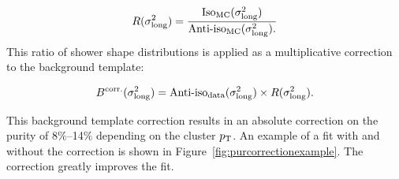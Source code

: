 \begin{equation}
    R(\sigma^{2}_{\mathrm{long}})=\frac{\text{Iso}_{\text{MC}}(\sigma^{2}_{\mathrm{long}})}{\text{Anti-iso}_{\text{MC}}(\sigma^{2}_{\mathrm{long}}).}
    \label{eq:bkgtemplateweights}
\end{equation}
This ratio of shower shape distributions is applied as a multiplicative correction to the background template:

\begin{equation}
    B^{\text{corr.}}(\sigma^{2}_{\mathrm{long}})=\text{Anti-iso}_{\text{data}}(\sigma^{2}_{\mathrm{long}})\times R(\sigma^{2}_{\mathrm{long}}).
    \label{eq:bkgtemplatecorrection}
\end{equation}

This background template correction results in an absolute correction on the purity of 8$\%$--14$\%$ depending on the cluster $p_{\mathrm{T}}$. An example of a fit with and without the correction is shown in Figure~\ref{fig:purcorrectionexample}. The correction greatly improves the fit. 




